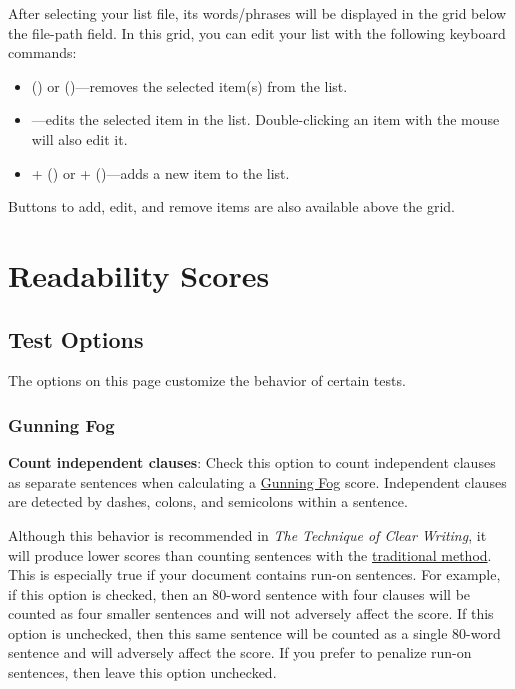 \documentclass[
]{book}
\providecommand{\tightlist}{%
  \setlength{\itemsep}{0pt}\setlength{\parskip}{0pt}}
\theoremstyle{definition}
\theoremstyle{definition}
\theoremstyle{definition}
\theoremstyle{definition}
\theoremstyle{remark}
\begin{document}
\begin{minipage}{\textwidth}
After selecting your list file, its words/phrases will be displayed in the grid below the file-path field. In this grid, you can edit your list with the following keyboard commands:

\begin{itemize}
\tightlist
\item
   (\faWindows) or \keys{\backdel} (\faApple)---removes the selected item(s) from the list.
\item
  ---edits the selected item in the list. Double-clicking an item with the mouse will also edit it.
\item
  + (\faWindows) or \keys{\cmd}+ (\faApple)---adds a new item to the list.
\end{itemize}

Buttons to add, edit, and remove items are also available above the grid.

\end{minipage}

\newpage

\hypertarget{readability-test-options}{%
\section{Readability Scores}\label{readability-test-options}}

\hypertarget{options-test-options}{%
\subsection*{Test Options}\label{options-test-options}}

The options on this page customize the behavior of certain tests.

\hypertarget{options-gunning-fog}{%
\subsubsection*{Gunning Fog}\label{options-gunning-fog}}

\textbf{Count independent clauses}: Check this option to count independent clauses as separate sentences when calculating a \protect\hyperlink{gunning-fog-test}{Gunning Fog} score. Independent clauses are detected by dashes, colons, and semicolons within a sentence.

Although this behavior is recommended in \emph{The Technique of Clear Writing}, it will produce lower scores than counting sentences with the \protect\hyperlink{how-sentences-are-counted}{traditional method}. This is especially true if your document contains run-on sentences. For example, if this option is checked, then an 80-word sentence with four clauses will be counted as four smaller sentences and will not adversely affect the score. If this option is unchecked, then this same sentence will be counted as a single 80-word sentence and will adversely affect the score. If you prefer to penalize run-on sentences, then leave this option unchecked.
\end{document}

